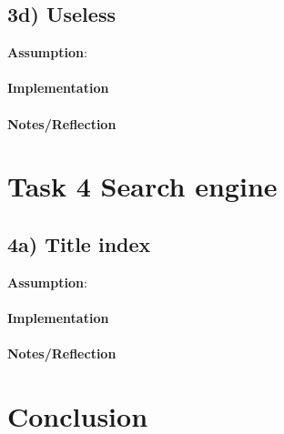 \documentclass[fleqn,10pt]{wlscirep}
\begin{document}
\subsection*{3d) Useless}
\textbf{Assumption}:  \\ \\
\textbf{Implementation}  \\ \\
\textbf{Notes/Reflection}

\section*{Task 4 Search engine}
\subsection*{4a) Title index}
\textbf{Assumption}:  \\ \\
\textbf{Implementation}  \\ \\
\textbf{Notes/Reflection}

\section*{Conclusion}
\end{document}
